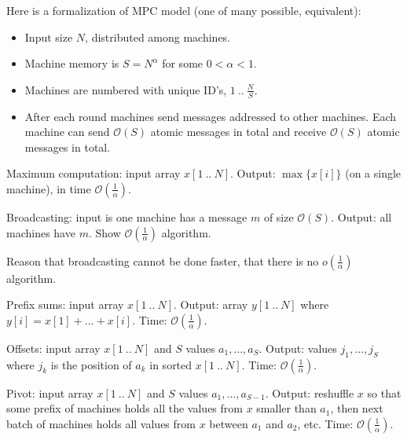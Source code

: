 \documentclass[12pt]{uebung}
\begin{document}
 
\newcommand{\bigo}{\mathcal{O}}
\renewcommand{\aufgname}{Exercise}


Here is a formalization of MPC model (one of many possible, equivalent):

\begin{itemize}
\item Input size $N$, distributed among machines.
\item Machine memory is $S = N^{\alpha}$ for some $0 < \alpha < 1$.
\item Machines are numbered with unique ID's, $1\ ..\ \frac{N}{S}$.
\item After each round machines send messages addressed to other machines. Each machine can send $\bigo(S)$ atomic messages  in total and receive $\bigo(S)$ atomic messages in total.
\end{itemize}

\begin{aufg}
Maximum computation: input array $x[1\ ..\ N]$. Output: $\max\{x[i]\}$ (on a single machine), in time $\bigo(\frac{1}{\alpha})$.
\end{aufg}

\begin{aufg}
Broadcasting: input is one machine has a message $m$ of size $\bigo(S)$. Output: all machines have $m$. Show $\bigo(\frac{1}{\alpha})$ algorithm.
\end{aufg}

\begin{aufg}
Reason that broadcasting cannot be done faster, that there is no $o(\frac{1}{\alpha})$ algorithm.
\end{aufg}

\begin{aufg}
Prefix sums:  input array $x[1\ ..\ N]$. Output: array $y[1\ ..\ N]$ where $y[i] = x[1]+\ldots+x[i]$. Time: $\bigo(\frac{1}{\alpha})$.
\end{aufg}

\begin{aufg}
Offsets: input array $x[1\ ..\ N]$ and $S$ values $a_1,\ldots,a_S$. Output: values $j_1,\ldots,j_S$ where $j_k$ is the position of $a_k$ in sorted $x[1\ ..\ N]$. Time: $\bigo(\frac{1}{\alpha})$.
\end{aufg}

\begin{aufg}
Pivot: input array $x[1\ ..\ N]$ and $S$ values $a_1,\ldots,a_{S-1}$. Output: reshuffle $x$ so that some prefix of machines holds all the values from $x$ smaller than $a_1$, then next batch of machines holds all values from $x$ between $a_1$ and $a_2$, etc. Time: $\bigo(\frac{1}{\alpha})$.
\end{aufg}
\end{document}
